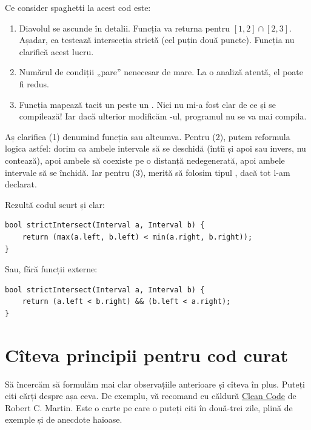 \documentclass[../main.tex]{subfiles}
\begin{document}
Ce consider spaghetti la acest cod este:

\begin{enumerate}
  \item Diavolul se ascunde în detalii. Funcția va returna  pentru $[1,2] \cap [2,3]$. Așadar, ea testează intersecția strictă (cel puțin două puncte). Funcția nu clarifică acest lucru.

  \item Numărul de condiții „pare” nenecesar de mare. La o analiză atentă, el poate fi redus.

  \item Funcția mapează tacit un  peste un . Nici nu mi-a fost clar de ce  și  se compilează! Iar dacă ulterior modificăm -ul, programul nu se va mai compila.
\end{enumerate}

Aș clarifica (1) denumind funcția  sau altcumva. Pentru (2), putem reformula logica astfel: dorim ca ambele intervale să se deschidă (întîi  și apoi  sau invers, nu contează), apoi ambele să coexiste pe o distanță nedegenerată, apoi ambele intervale să se închidă. Iar pentru (3), merită să folosim tipul , dacă tot l-am declarat.

Rezultă codul scurt și clar:

\begin{verbatim}
bool strictIntersect(Interval a, Interval b) {
    return (max(a.left, b.left) < min(a.right, b.right));
}
\end{verbatim}

Sau, fără funcții externe:

\begin{verbatim}
bool strictIntersect(Interval a, Interval b) {
    return (a.left < b.right) && (b.left < a.right);
}
\end{verbatim}


\section{Cîteva principii pentru cod curat}

Să încercăm să formulăm mai clar observațiile anterioare și cîteva în plus. Puteți citi cărți despre așa ceva. De exemplu, vă recomand cu căldură \href{https://www.oreilly.com/library/view/clean-code-a/9780135398586/}{Clean Code} de Robert C. Martin. Este o carte pe care o puteți citi în două-trei zile, plină de exemple și de anecdote haioase.
\end{document}
